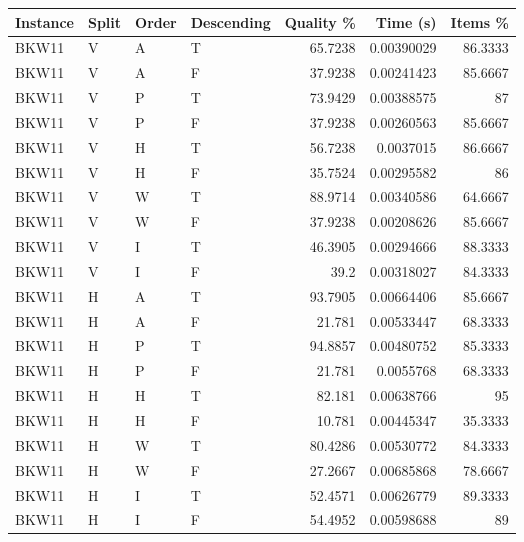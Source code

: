 \begin{tabular}{llllrrr}
    \hline
    Instance & Split & Order & Descending & Quality \% & Time (s)   & Items \% \\
    \hline
    BKW11    & V     & A     & T          & 65.7238    & 0.00390029 & 86.3333  \\
    BKW11    & V     & A     & F          & 37.9238    & 0.00241423 & 85.6667  \\
    BKW11    & V     & P     & T          & 73.9429    & 0.00388575 & 87       \\
    BKW11    & V     & P     & F          & 37.9238    & 0.00260563 & 85.6667  \\
    BKW11    & V     & H     & T          & 56.7238    & 0.0037015  & 86.6667  \\
    BKW11    & V     & H     & F          & 35.7524    & 0.00295582 & 86       \\
    BKW11    & V     & W     & T          & 88.9714    & 0.00340586 & 64.6667  \\
    BKW11    & V     & W     & F          & 37.9238    & 0.00208626 & 85.6667  \\
    BKW11    & V     & I     & T          & 46.3905    & 0.00294666 & 88.3333  \\
    BKW11    & V     & I     & F          & 39.2       & 0.00318027 & 84.3333  \\
    BKW11    & H     & A     & T          & 93.7905    & 0.00664406 & 85.6667  \\
    BKW11    & H     & A     & F          & 21.781     & 0.00533447 & 68.3333  \\
    BKW11    & H     & P     & T          & 94.8857    & 0.00480752 & 85.3333  \\
    BKW11    & H     & P     & F          & 21.781     & 0.0055768  & 68.3333  \\
    BKW11    & H     & H     & T          & 82.181     & 0.00638766 & 95       \\
    BKW11    & H     & H     & F          & 10.781     & 0.00445347 & 35.3333  \\
    BKW11    & H     & W     & T          & 80.4286    & 0.00530772 & 84.3333  \\
    BKW11    & H     & W     & F          & 27.2667    & 0.00685868 & 78.6667  \\
    BKW11    & H     & I     & T          & 52.4571    & 0.00626779 & 89.3333  \\
    BKW11    & H     & I     & F          & 54.4952    & 0.00598688 & 89       \\

\end{tabular}

